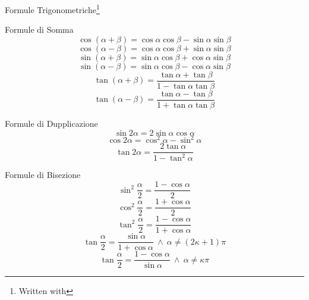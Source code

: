 \documentclass[a4paper,10pt,fleqn,oneside]{article}
\date{19/9/2006}
\begin{document}
\noindent
{\Large Formule Trigonometriche}\footnote{Written with \LaTeXe}\\
\vspace{1cm}

Formule di Somma
\begin{equation}
\cos(\alpha +\beta)=\cos\alpha\cos\beta -\sin\alpha\sin\beta 
\end{equation}
\begin{equation}
 \cos(\alpha -\beta)=\cos\alpha\cos\beta +\sin\alpha\sin\beta
\end{equation}
\begin{equation}
 \sin(\alpha +\beta)=\sin\alpha\cos\beta+\cos\alpha\sin\beta
\end{equation}
\begin{equation}
 \sin(\alpha -\beta)=\sin\alpha\cos\beta-\cos\alpha\sin\beta
\end{equation}
\begin{equation}
 \tan(\alpha +\beta)=\frac{\tan\alpha +\tan\beta}{1-\tan\alpha\tan\beta}
\end{equation}
\begin{equation}
 \tan(\alpha -\beta)=\frac{\tan\alpha -\tan\beta}{1+\tan\alpha\tan\beta}
\end{equation}
\vspace{1cm}

Formule di Dupplicazione
\begin{equation}
 \sin 2\alpha=2\sin\alpha\cos\alpha
\end{equation}
\begin{equation}
 \cos 2\alpha=\cos^2\alpha -\sin^2\alpha
\end{equation}
\begin{equation}
 \tan 2\alpha=\frac{2\tan\alpha}{1-\tan^2\alpha}
\end{equation}
\vspace{1cm}

Formule di Bisezione
\begin{equation}
 \sin^2\frac{\alpha}{2}=\frac{1-\cos\alpha}{2}
\end{equation}
\begin{equation}
 \cos^2\frac{\alpha}{2}=\frac{1+\cos\alpha}{2}
\end{equation}
\begin{equation}
 \tan^2\frac{\alpha}{2}=\frac{1-\cos\alpha}{1+\cos\alpha}
\end{equation}
\begin{equation}
 \tan\frac{\alpha}{2}=\frac{\sin\alpha}{1+\cos\alpha}\ \wedge\ \alpha\neq(2\kappa +1)\pi
\end{equation}
\begin{equation}
 \tan\frac{\alpha}{2}=\frac{1-\cos\alpha}{\sin\alpha}\ \wedge\ \alpha\neq\kappa\pi
\end{equation}
\end{document}
